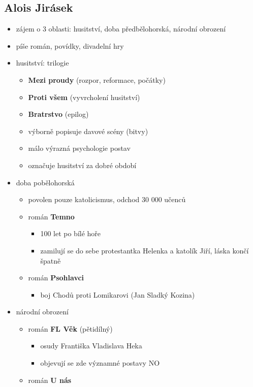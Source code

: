 \subsection{Alois Jirásek}
\begin{itemize}
\item zájem o 3 oblasti: husitství, doba předbělohorská, národní obrození
\item píše román, povídky, divadelní hry
\item husitství: trilogie 
	\begin{itemize}
	\item \textbf{Mezi proudy} (rozpor, reformace, počátky)
	\item \textbf{Proti všem} (vyvrcholení husitství)
	\item \textbf{Bratrstvo} (epilog)
	\item výborně popisuje davové scény (bitvy)
	\item málo výrazná psychologie postav
	\item označuje husitství za dobré období
	\end{itemize}
\item doba pobělohorská
	\begin{itemize}
	\item povolen pouze katolicismus, odchod 30 000 učenců
	\item román \textbf{Temno}
		\begin{itemize}
		\item 100 let po bílé hoře
		\item zamilují se do sebe protestantka Helenka a katolík Jiří, láska končí špatně
		\end{itemize}
	\item román \textbf{Psohlavci}
		\begin{itemize}
		\item boj Chodů proti Lomikarovi (Jan Sladký Kozina)
		\end{itemize}
	\end{itemize}
\item národní obrození
	\begin{itemize}
	\item román \textbf{FL Věk} (pětidílný)
		\begin{itemize}
		\item osudy Františka Vladislava Heka
		\item objevují se zde významné postavy NO
		\end{itemize}
	\item román \textbf{U nás}

\end{itemize}
\end{itemize}
